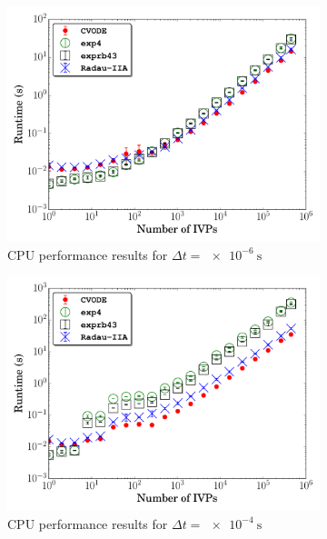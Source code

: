 \documentclass[11pt]{scrartcl}
\begin{document}
\begin{figure}[htbp]
  \centering
  \begin{subfigure}{0.49\textwidth}
      \includegraphics[width=\linewidth]{CH4_1e-06_cpu_nonorm.pdf}
      \caption{CPU performance results for $\Delta t = \SI{e-6}{\second}$}
  \end{subfigure}
  \begin{subfigure}{0.49\textwidth}
      \includegraphics[width=\linewidth]{CH4_1e-04_cpu_nonorm.pdf}
      \caption{CPU performance results for $\Delta t = \SI{e-4}{\second}$}
  \end{subfigure}\\
  \begin{subfigure}{0.49\textwidth}

\end{subfigure}
\end{figure}
\end{document}

